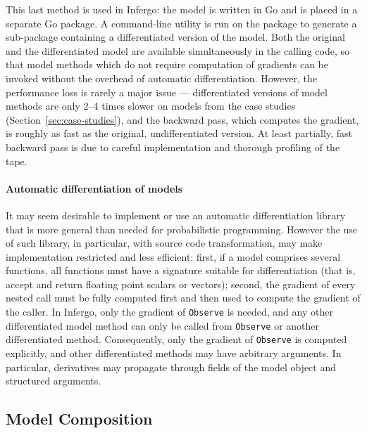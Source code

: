 \documentclass[sigplan,review,10pt,anonymous]{acmart}
\begin{document}
\begin{sloppypar}
This last method is used in Infergo: the model is written in Go
and is placed in a separate Go package. A command-line utility
is run on the package to generate a sub-package containing a
differentiated version of the model.  Both the original and the
differentiated model are available simultaneously in the calling
code, so that model methods which do not require computation of
gradients can be invoked without the overhead of automatic
differentiation.  However, the performance loss is rarely a
major issue --- differentiated versions of model methods are
only 2--4 times slower on models from the case studies
(Section~\ref{sec:case-studies}), and the backward pass, which
computes the gradient, is roughly as fast as the original,
undifferentiated version. At least partially, fast backward pass
is due to careful implementation and thorough profiling of the
tape.

\paragraph{Automatic differentiation of models}
It may seem desirable to implement or use an automatic
differentiation library that is more general than needed for
probabilistic programming. However the use of such library, in
particular, with source code transformation, may make
implementation restricted and less efficient: first, if a model
comprises several functions, all functions must have a signature
suitable for differentiation (that is, accept and return
floating point scalars or vectors); second, the gradient of
every nested call must be fully computed first and then used to
compute the gradient of the caller. In Infergo, only the
gradient of \lstinline{Observe} is needed, and any other
differentiated model method can only be called from
\lstinline{Observe} or another differentiated method.
Consequently, only the gradient of \lstinline{Observe} is
computed explicitly, and other differentiated methods may have
arbitrary arguments. In particular, derivatives may propagate
through fields of the model object and structured arguments.

\subsection{Model Composition} 


\end{sloppypar}
\end{document}
